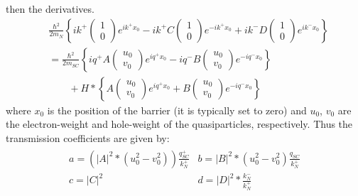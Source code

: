then the derivatives.
\begin{align}
    &\frac{\hbar^{2}}{2m_{N}}\left\{
    ik^{+}\begin{pmatrix}1\\0\end{pmatrix}e^{ik^{+}x_{0}}
    -ik^{+}C\begin{pmatrix}1\\0\end{pmatrix}e^{-ik^{+}x_{0}}
    +ik^{-}D\begin{pmatrix}1\\0\end{pmatrix}e^{ik^{-}x_{0}}
    \right\}\\
    &= \frac{\hbar^{2}}{2m_{SC}}\left\{
    iq^{+}A\begin{pmatrix}u_{0}\\v_{0}\end{pmatrix}e^{iq^{+}x_{0}}
    -iq^{-}B\begin{pmatrix}u_{0}\\v_{0}\end{pmatrix}e^{-iq^{-}x_{0}}
    \right\}\\
    &\qquad+H*\left\{
    A\begin{pmatrix}u_{0}\\v_{0}\end{pmatrix}e^{iq^{+}x_{0}}
    +B\begin{pmatrix}u_{0}\\v_{0}\end{pmatrix}e^{-iq^{-}x_{0}}
    \right\}
\end{align}
where $x_{0}$ is the position of the barrier (it is typically set to zero) and $u_{0}$, $v_{0}$ are the electron-weight and hole-weight of the quasiparticles, respectively. Thus the transmission coefficients are given by:
\begin{align}
    \begin{matrix}
    a=\left(\left|A\right|^{2}*\left(u_{0}^{2}-v_{0}^{2}\right)\right)\frac{q_{SC}^{+}}{k_{N}^{+}} & b=\left|B\right|^{2}*\left(u_{0}^{2}-v_{0}^{2}\right)\frac{q_{SC}}{k_{N}^{+}}\\
    c = \left|C\right|^{2} & d = \left|D\right|^{2}*\frac{k_{N}^{-}}{k_{N}^{+}}
    \end{matrix}
\end{align}

